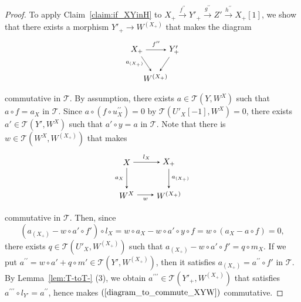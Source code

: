 \documentclass[a4paper,reqno,10pt]{amsart}
\DeclareRobustCommand{\darkblueedit}[1]{#1}
\theoremstyle{definition}
\theoremstyle{definition}
\theoremstyle{definition}
\theoremstyle{definition}
\theoremstyle{plain}
\newcommand{\CT}{\mathcal{T}}
\begin{document}
\begin{proof}
To apply Claim~\ref{claim:if_XYinH} to $X_+\xrightarrow{f^{\prime\prime}}Y'_+\xrightarrow{g^{\prime\prime}}Z'\xrightarrow{h^{\prime\prime}}X_+[1]$, we show that there exists a morphism $Y'_+\to W^{(X_+)}$ that makes the diagram
\begin{equation}\label{diagram_to_commute_XYW}
\begin{tikzpicture}[>=stealth]
\node (1) at (-0.8,0.5) {$X_+$};
\node (2) at (0.8,0.5) {$Y'_+$};
\node (3) at (0,-0.7) {$W^{(X_+)}$};
\draw[->] (1) -- node[above,font=\scriptsize] {$f^{\prime\prime}$} (2);
\draw[->] (1) -- node[left,font=\scriptsize] {$a_{(X_+)}$} (3);
\draw[->] (2) -- node[above,font=\scriptsize] {} (3);
\end{tikzpicture}
\end{equation}
commutative in $\CT$.
By assumption, there exists $a\in\CT(Y,W^X)$ such that $a\circ f=a_X$ in $\CT$. 
\color{blue}
Since $a\circ(f\circ u^{\prime\prime}_X)=0$ by $\CT(U'_X[-1],W^X)=0$, 
\normalcolor
there exists $a'\in\CT(Y',W^X)$ such that $a'\circ y=a$ in $\CT$. 
Note that there is $w\in\CT(W^X,W^{(X_+)})$ that makes
\[
\begin{tikzpicture}[>=stealth]
\node (1) at (-0.9,0.7) {$X$};
\node (2) at (0.9,0.7) {$X_+$};
\node (3) at (-0.9,-0.7) {$W^X$};
\node (4) at (0.9,-0.7) {$W^{(X_+)}$};
\draw[->] (1) -- node[above,font=\scriptsize] {$l_X$} (2);
\draw[->] (1) -- node[left,font=\scriptsize] {$a_X$} (3);
\draw[->] (2) -- node[right,font=\scriptsize] {$a_{(X_+)}$} (4);
\draw[->] (3) -- node[below,font=\scriptsize] {$w$} (4);
\end{tikzpicture}
\]
commutative in $\CT$.
Then, since 
\[
(a_{(X_+)}-w\circ a'\circ f')\circ l_X=w\circ a_X-w\circ a'\circ y\circ f=w\circ(a_X-a\circ f)=0,
\]
\darkblueedit{there exists} %
$q\in\CT(U'_X,W^{(X_+)})$ such that $a_{(X_+)}-w\circ a'\circ f'=q\circ m_X$.
If we put $a^{\prime\prime}=w\circ a'+q\circ m'\in\CT(Y',W^{(X_+)})$, then it satisfies $a_{(X_+)}=a^{\prime\prime}\circ f'$ in $\CT$.
By Lemma~\ref{lem:T-toT-} {\rm (3)}, we obtain $a^{\prime\prime\prime}\in\CT(Y'_+,W^{(X_+)})$ that satisfies $a^{\prime\prime\prime}\circ l_{Y'}=a^{\prime\prime}$, hence makes $(\ref{diagram_to_commute_XYW})$ commutative.


\end{proof}
\end{document}
